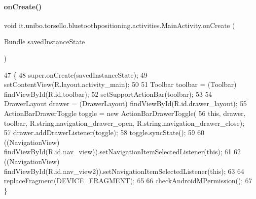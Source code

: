 \paragraph{\texorpdfstring{on\+Create()}{onCreate()}}
{\footnotesize\ttfamily void it.\+unibo.\+torsello.\+bluetoothpositioning.\+activities.\+Main\+Activity.\+on\+Create (\begin{DoxyParamCaption}\item[{Bundle}]{saved\+Instance\+State }\end{DoxyParamCaption})\hspace{0.3cm}{\ttfamily [protected]}}


\begin{DoxyCode}
47                                                        \{
48         super.onCreate(savedInstanceState);
49         setContentView(R.layout.activity\_main);
50 
51         Toolbar toolbar = (Toolbar) findViewById(R.id.toolbar);
52         setSupportActionBar(toolbar);
53 
54         DrawerLayout drawer = (DrawerLayout) findViewById(R.id.drawer\_layout);
55         ActionBarDrawerToggle toggle = \textcolor{keyword}{new} ActionBarDrawerToggle(
56                 \textcolor{keyword}{this}, drawer, toolbar, R.string.navigation\_drawer\_open, R.string.navigation\_drawer\_close);
57         drawer.addDrawerListener(toggle);
58         toggle.syncState();
59 
60         ((NavigationView) findViewById(R.id.nav\_view)).setNavigationItemSelectedListener(\textcolor{keyword}{this});
61 
62         ((NavigationView) findViewById(R.id.nav\_view2)).setNavigationItemSelectedListener(\textcolor{keyword}{this});
63 
64         \hyperlink{classit_1_1unibo_1_1torsello_1_1bluetoothpositioning_1_1activities_1_1MainActivity_a98db4478d28cd91118138d0b652ceb2c_a98db4478d28cd91118138d0b652ceb2c}{replaceFragment}(\hyperlink{classit_1_1unibo_1_1torsello_1_1bluetoothpositioning_1_1activities_1_1MainActivity_a2f77c0245ac2525dc58905e38e1817d1_a2f77c0245ac2525dc58905e38e1817d1}{DEVICE\_FRAGMENT});
65 
66         \hyperlink{classit_1_1unibo_1_1torsello_1_1bluetoothpositioning_1_1activities_1_1MainActivity_ab762aac3d11f5b0ccc6042a140804d5d_ab762aac3d11f5b0ccc6042a140804d5d}{checkAndroidMPermission}();
67     \}
\end{DoxyCode}
\hypertarget{classit_1_1unibo_1_1torsello_1_1bluetoothpositioning_1_1activities_1_1MainActivity_a7cfc0a2ee94c12afaac3b7472eeb75b7_a7cfc0a2ee94c12afaac3b7472eeb75b7}{}\label{classit_1_1unibo_1_1torsello_1_1bluetoothpositioning_1_1activities_1_1MainActivity_a7cfc0a2ee94c12afaac3b7472eeb75b7_a7cfc0a2ee94c12afaac3b7472eeb75b7} 
